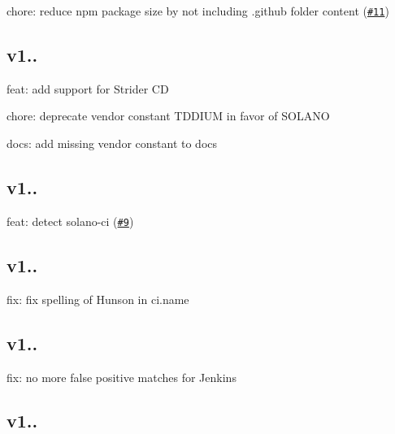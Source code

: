 \begin{DoxyItemize}
\item chore\+: reduce npm package size by not including {\ttfamily .github} folder content (\href{https://github.com/watson/ci-info/pull/11}{\tt \#11})
\end{DoxyItemize}

\subsection*{v1..}


\begin{DoxyItemize}
\item feat\+: add support for Strider CD
\item chore\+: deprecate vendor constant {\ttfamily T\+D\+D\+I\+UM} in favor of {\ttfamily S\+O\+L\+A\+NO}
\item docs\+: add missing vendor constant to docs
\end{DoxyItemize}

\subsection*{v1..}


\begin{DoxyItemize}
\item feat\+: detect solano-\/ci (\href{https://github.com/watson/ci-info/pull/9}{\tt \#9})
\end{DoxyItemize}

\subsection*{v1..}


\begin{DoxyItemize}
\item fix\+: fix spelling of Hunson in {\ttfamily ci.\+name}
\end{DoxyItemize}

\subsection*{v1..}


\begin{DoxyItemize}
\item fix\+: no more false positive matches for Jenkins
\end{DoxyItemize}

\subsection*{v1..}


